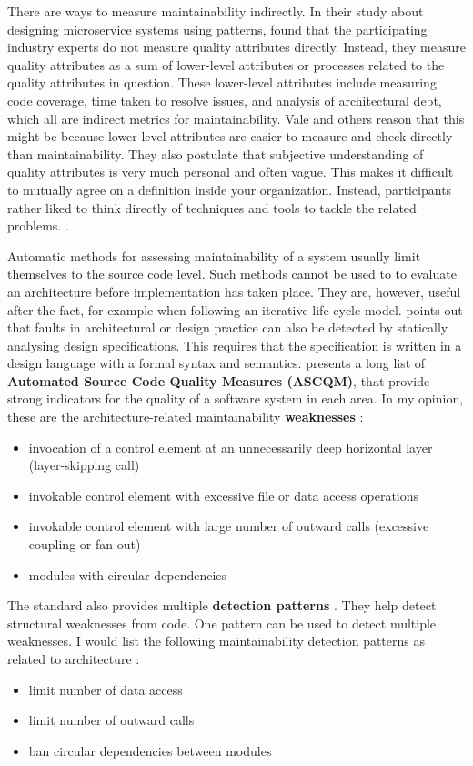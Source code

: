 \documentclass[utf8,english]{gradu3}
\begin{document}
There are ways to measure maintainability indirectly. In their study about
designing microservice systems using patterns, \textcite[9]{Vale2022} found that
the participating industry experts do not measure quality attributes directly.
Instead, they measure quality attributes as a sum of lower-level attributes or
processes related to the quality attributes in question. These lower-level
attributes include measuring code coverage, time taken to resolve issues, and
analysis of architectural debt, which all are indirect metrics for
maintainability. Vale and others reason that this might be because lower level
attributes are easier to measure and check directly than maintainability. They
also postulate that subjective understanding of quality attributes is very much
personal and often vague. This makes it difficult to mutually agree on a
definition inside your organization. Instead, participants rather liked to think directly
of techniques and tools to tackle the related problems. \parencite[7-10]{Vale2022}.

Automatic methods for assessing maintainability of a system usually limit
themselves to the source code level. Such methods cannot be used to to evaluate
an architecture before implementation has taken place. They are, however, useful
after the fact, for example when following an iterative life cycle model.
\textcite[1]{ISO5055} points out that faults in architectural or design practice can
also be detected by statically analysing design specifications. This requires
that the specification is written in a design language with a formal syntax and
semantics. \textcite[2]{ISO5055} presents a long list of \textbf{Automated Source Code Quality
  Measures (ASCQM)}, that provide strong indicators for the quality of a software
system in each area. In my opinion, these are the architecture-related
maintainability \textbf{weaknesses} \parencite[38-47]{ISO5055}:
\begin{itemize}
  \item invocation of a control element at an unnecessarily deep horizontal layer (layer-skipping call)
  \item invokable control element with excessive file or data access operations
  \item invokable control element with large number of outward calls (excessive coupling
        or fan-out)
  \item modules with circular dependencies
\end{itemize}

The standard also provides multiple \textbf{detection patterns}
\parencite[2]{ISO5055}. They help detect structural weaknesses from code. One
pattern can be used to detect multiple weaknesses. I would list the following
maintainability detection patterns as related to architecture \parencite[48-54]{ISO5055}:
\begin{itemize}
  \item limit number of data access
  \item limit number of outward calls
  \item ban circular dependencies between modules
\end{itemize}
\end{document}
